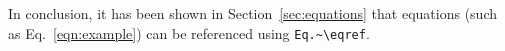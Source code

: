 In conclusion, it has been shown in Section~\ref{sec:equations} that equations (such as Eq.~\eqref{eqn:example}) can be referenced using \verb|Eq.~\eqref|.